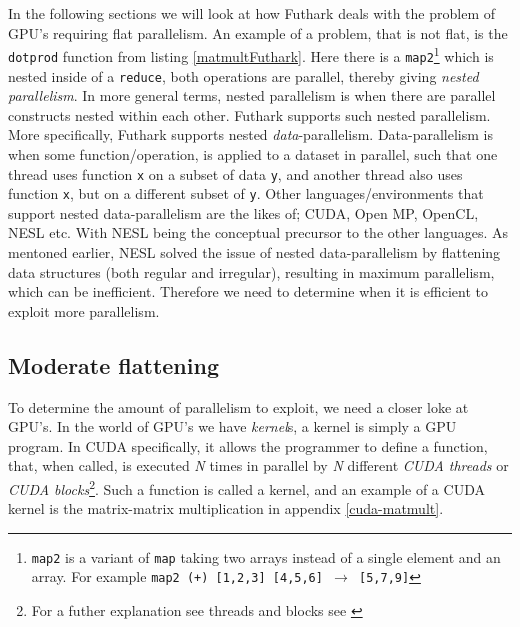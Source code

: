 In the following sections we will look at how Futhark deals with the problem of GPU's requiring flat parallelism. An example of a problem, that is not flat, is the \texttt{dotprod} function from listing \ref{matmultFuthark}. Here there is a \texttt{map2}\footnote{\texttt{map2} is a variant of \texttt{map} taking two arrays instead of a single element and an array. For example \texttt{map2 (+) [1,2,3] [4,5,6] $\to$ [5,7,9]}} which is nested inside of a \texttt{reduce}, both operations are parallel, thereby giving \textit{nested parallelism}. In more general terms, nested parallelism is when there are parallel constructs nested within each other. Futhark supports such nested parallelism. More specifically, Futhark supports nested \textit{data}-parallelism. Data-parallelism is when some function/operation, is applied to a dataset in parallel, such that one thread uses function \texttt{x} on a subset of data \texttt{y}, and another thread also uses function \texttt{x}, but on a different subset of \texttt{y}. Other languages/environments that support nested data-parallelism are the likes of; CUDA, Open MP, OpenCL, NESL etc. With NESL being the conceptual precursor to the other languages. As mentoned earlier, NESL solved the issue of nested data-parallelism by flattening data structures (both regular and irregular), resulting in maximum parallelism, which can be inefficient. Therefore we need to determine when it is efficient to exploit more parallelism. 

\subsection{Moderate flattening}
To determine the amount of parallelism to exploit, we need a closer loke at GPU's. In the world of GPU's we have \textit{kernel}s, a kernel is simply a GPU program. In CUDA specifically, it allows the programmer to define a function, that, when called, is executed \textit{N} times in parallel by \textit{N} different \textit{CUDA threads} or \textit{CUDA blocks}\footnote{For a futher explanation see threads and blocks see \cite{prog-guide-cuda}}. Such a function is called a kernel, and an example of a CUDA kernel is the matrix-matrix multiplication in appendix \ref{cuda-matmult}. 

